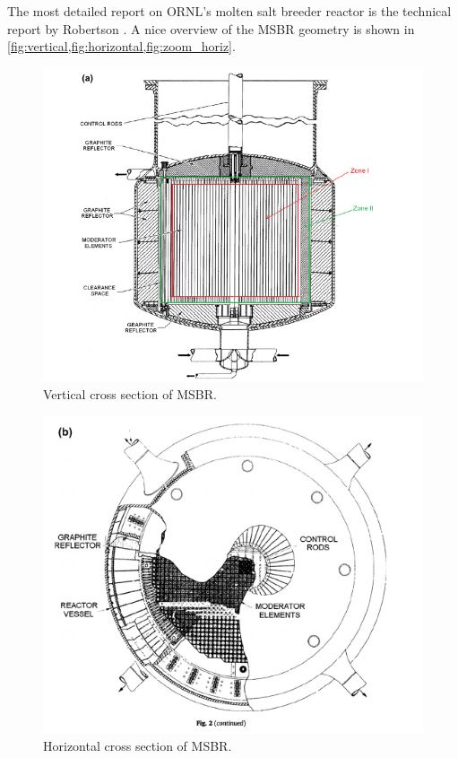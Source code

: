 \documentclass{article}
\begin{document}
The most detailed report on \gls{ORNL}'s molten salt breeder reactor is the technical
report by Robertson \cite{robertson_conceptual_1971}. A nice overview of the
MSBR geometry is shown in \cref{fig:vertical,fig:horizontal,fig:zoom_horiz}.

\begin{figure}[htpb]
  \centering
  \includegraphics[max height=.5\textheight,max width=\textwidth,keepaspectratio]{vertical_MSBR_cross_section.png}
  \caption{Vertical cross section of MSBR.}
  \label{fig:vertical}
\end{figure}
\begin{figure}[htpb]
  \centering
  \includegraphics[max height=.5\textheight,max width=\textwidth,keepaspectratio]{horizontal_MSBR_cross_section.png}
  \caption{Horizontal cross section of MSBR.}
  \label{fig:horizontal}
\end{figure}
\end{document}
